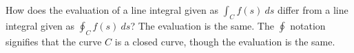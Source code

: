 {How does the evaluation of a line integral given as $\int_C f(s)\ ds$ differ from a line integral given as $\oint_C f(s)\ ds$?
}
{The evaluation is the same. The $\oint$ notation signifies that the curve $C$ is a closed curve, though the evaluation is the same.
}
